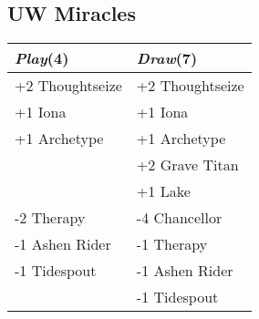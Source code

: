 \documentclass{article}
\renewcommand *\contentsname{Contents}
\begin{document}
\begin{multicols}{2}
\subsection*{UW Miracles}
\begin{center}
\begin{tabular}{| l | l |}
\hline
\textit{Play}(4) & \textit{Draw}(7) \\
\hline
\cellcolor[HTML]{BBDDBB}\small{+2 Thoughtseize} & \cellcolor[HTML]{BBDDBB}\small{+2 Thoughtseize}\\
\cellcolor[HTML]{BBDDBB}\small{+1 Iona} & \cellcolor[HTML]{BBDDBB}\small{+1 Iona}\\
\cellcolor[HTML]{BBDDBB}\small{+1 Archetype} & \cellcolor[HTML]{BBDDBB}\small{+1 Archetype}\\
 & \cellcolor[HTML]{BBDDBB}\small{+2 Grave Titan}\\
 & \cellcolor[HTML]{BBDDBB}\small{+1 Lake}\\
\cellcolor[HTML]{DDBBBB}\small{-2 Therapy} & \cellcolor[HTML]{DDBBBB}\small{-4 Chancellor}\\
\cellcolor[HTML]{DDBBBB}\small{-1 Ashen Rider} & \cellcolor[HTML]{DDBBBB}\small{-1 Therapy}\\
\cellcolor[HTML]{DDBBBB}\small{-1 Tidespout} & \cellcolor[HTML]{DDBBBB}\small{-1 Ashen Rider}\\
 & \cellcolor[HTML]{DDBBBB}\small{-1 Tidespout}\\
\hline
\end{tabular}
\end{center}
\end{multicols}
\end{document}

